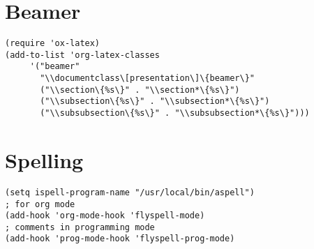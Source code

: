 \documentclass[11pt]{article}
\begin{document}
\section{Beamer}
\label{sec:org65dab9b}

\begin{verbatim}
(require 'ox-latex)
(add-to-list 'org-latex-classes
	 '("beamer"
	   "\\documentclass\[presentation\]\{beamer\}"
	   ("\\section\{%s\}" . "\\section*\{%s\}")
	   ("\\subsection\{%s\}" . "\\subsection*\{%s\}")
	   ("\\subsubsection\{%s\}" . "\\subsubsection*\{%s\}")))
\end{verbatim}

\section{Spelling}
\label{sec:org37545e8}
\begin{verbatim}
(setq ispell-program-name "/usr/local/bin/aspell")
; for org mode
(add-hook 'org-mode-hook 'flyspell-mode)
; comments in programming mode
(add-hook 'prog-mode-hook 'flyspell-prog-mode)
\end{verbatim}
\end{document}
